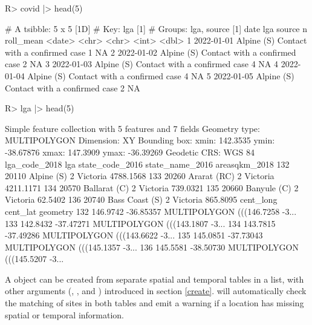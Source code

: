 \documentclass[
]{jss}
\begin{document}
\begin{CodeChunk}
\begin{CodeInput}
R> covid |> head(5)
\end{CodeInput}
\begin{CodeOutput}
# A tsibble: 5 x 5 [1D]
# Key:       lga [1]
# Groups:    lga, source [1]
  date       lga        source                            n roll_mean
  <date>     <chr>      <chr>                         <int>     <dbl>
1 2022-01-01 Alpine (S) Contact with a confirmed case     1        NA
2 2022-01-02 Alpine (S) Contact with a confirmed case     2        NA
3 2022-01-03 Alpine (S) Contact with a confirmed case     4        NA
4 2022-01-04 Alpine (S) Contact with a confirmed case     4        NA
5 2022-01-05 Alpine (S) Contact with a confirmed case     2        NA
\end{CodeOutput}
\begin{CodeInput}
R> lga |> head(5)
\end{CodeInput}
\begin{CodeOutput}
Simple feature collection with 5 features and 7 fields
Geometry type: MULTIPOLYGON
Dimension:     XY
Bounding box:  xmin: 142.3535 ymin: -38.67876 xmax: 147.3909 ymax: -36.39269
Geodetic CRS:  WGS 84
    lga_code_2018            lga state_code_2016 state_name_2016 areasqkm_2018
132         20110     Alpine (S)               2        Victoria     4788.1568
133         20260    Ararat (RC)               2        Victoria     4211.1171
134         20570   Ballarat (C)               2        Victoria      739.0321
135         20660    Banyule (C)               2        Victoria       62.5402
136         20740 Bass Coast (S)               2        Victoria      865.8095
    cent_long  cent_lat                       geometry
132  146.9742 -36.85357 MULTIPOLYGON (((146.7258 -3...
133  142.8432 -37.47271 MULTIPOLYGON (((143.1807 -3...
134  143.7815 -37.49286 MULTIPOLYGON (((143.6622 -3...
135  145.0851 -37.73043 MULTIPOLYGON (((145.1357 -3...
136  145.5581 -38.50730 MULTIPOLYGON (((145.5207 -3...
\end{CodeOutput}
\end{CodeChunk}

A  object can be created from separate spatial and temporal tables in a list, with other arguments (, , and ) introduced in section \ref{create}.  will automatically check the matching of sites in both tables and emit a warning if a location has missing spatial or temporal information.
\end{document}
